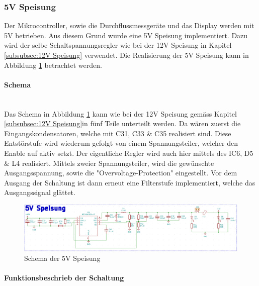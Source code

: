 \subsubsection{5V Speisung}
\label{subsubsec:5V Speisung}

Der Mikrocontroller, sowie die Durchflussmessgeräte und das Display  werden mit 5V betrieben. Aus diesem Grund wurde eine 5V Speisung implementiert. Dazu wird der selbe Schaltspannungsregler wie bei der 12V Speisung in Kapitel \ref{subsubsec:12V Speisung} verwendet. Die Realisierung der 5V Speisung kann in Abbildung \ref{fig:Schema_Speisung_5V} betrachtet werden.\\

\paragraph{Schema}\mbox{}\\

Das Schema in Abbildung \ref{fig:Schema_Speisung_5V} kann wie bei der 12V Speisung gemäss Kapitel \ref{subsubsec:12V Speisung}in fünf Teile unterteilt werden. Da wären zuerst die Eingangskondensatoren, welche mit C31, C33 \& C35 realisiert sind. Diese Entstörstufe wird wiederum gefolgt von einem Spannungsteiler, welcher den Enable auf aktiv setzt. Der eigentliche Regler wird auch hier mittels des IC6, D5 \& L4 realisiert. Mittels zweier Spannungsteiler, wird die gewünschte Ausgangsspannung, sowie die "Overvoltage-Protection" eingestellt. Vor dem Ausgang der Schaltung ist dann erneut eine Filterstufe implementiert, welche das Ausgangssignal glättet.

\begin{figure}[h!]
	\centering
	\includegraphics[width=\textwidth]{graphics/Schema_Speisung_5V.png}
	\caption{Schema der 5V Speisung}
	\label{fig:Schema_Speisung_5V}
\end{figure} 

\paragraph{Funktionsbeschrieb der Schaltung}\mbox{}\\

